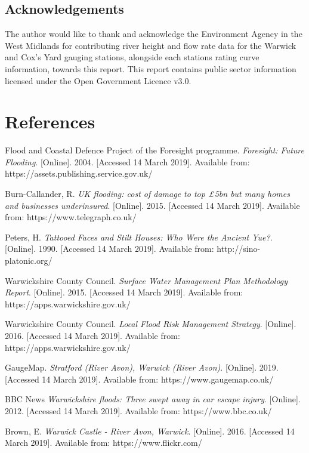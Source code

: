 \documentclass[11pt,a4paper]{article}
\begin{document}
\subsection{Acknowledgements}
The author would like to thank and acknowledge the Environment Agency in the West Midlands for contributing river height and flow rate data for the Warwick and Cox's Yard gauging stations, alongside each stations rating curve information, towards this report. This report contains public sector information licensed under the Open Government Licence v3.0.

\newpage
\section{References}
\begin{thebibliography}{}
Flood and Coastal Defence Project of the Foresight programme. \textit{Foresight: Future Flooding}. [Online]. 2004. [Accessed 14 March 2019]. Available from: https://assets.publishing.service.gov.uk/

Burn-Callander, R. \textit{UK flooding: cost of damage to top £5bn but many homes and businesses underinsured}. [Online]. 2015. [Accessed 14 March 2019]. Available from: https://www.telegraph.co.uk/

Peters, H. \textit{Tattooed Faces and Stilt Houses: Who Were the Ancient Yue?}. [Online]. 1990. [Accessed 14 March 2019]. Available from: http://sino-platonic.org/

Warwickshire County Council. \textit{Surface Water Management Plan Methodology Report}. [Online]. 2015. [Accessed 14 March 2019]. Available from: https://apps.warwickshire.gov.uk/

Warwickshire County Council. \textit{Local Flood Risk Management Strategy}. [Online]. 2016. [Accessed 14 March 2019]. Available from: https://apps.warwickshire.gov.uk/

\bibitem{}
GaugeMap. \textit{Stratford (River Avon), Warwick (River Avon)}. [Online]. 2019. [Accessed 14 March 2019]. Available from: https://www.gaugemap.co.uk/

\bibitem{}
BBC News \textit{Warwickshire floods: Three swept away in car escape injury}. [Online]. 2012. [Accessed 14 March 2019]. Available from: https://www.bbc.co.uk/

Brown, E. \textit{Warwick Castle - River Avon, Warwick}. [Online]. 2016. [Accessed 14 March 2019]. Available from: https://www.flickr.com/


\end{thebibliography}
\end{document}
